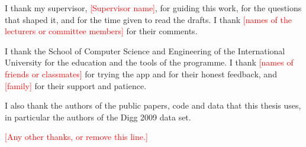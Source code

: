 \providecommand{\placeholder}[1]{\textcolor{red}{[#1]}}

I thank my supervisor, \placeholder{Supervisor name}, for guiding this work, for the questions that shaped it, and for the time given to read the drafts. I thank \placeholder{names of the lecturers or committee members} for their comments.

I thank the School of Computer Science and Engineering of the International University for the education and the tools of the programme. I thank \placeholder{names of friends or classmates} for trying the app and for their honest feedback, and \placeholder{family} for their support and patience.

I also thank the authors of the public papers, code and data that this thesis uses, in particular the authors of the Digg 2009 data set.

\placeholder{Any other thanks, or remove this line.}

